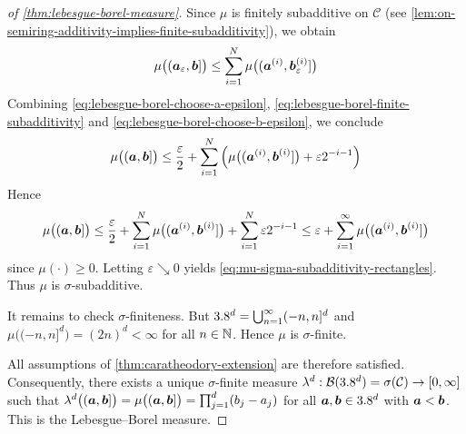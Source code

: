 \begin{proof}[of \autoref{thm:lebesgue-borel-measure}]
Since \(\mu\) is finitely subadditive on \(\mathcal{C}\) (see \autoref{lem:on-semiring-additivity-implies-finite-subadditivity}), we obtain
\begin{equation}\label{eq:lebesgue-borel-finite-subadditivity}
\mu\bigl(({\boldsymbol{a}}_\varepsilon,{\boldsymbol{b}}]\bigr)
\le
\sum_{i=1}^{N} \mu\bigl(({\boldsymbol{a}}^{(i)},{\boldsymbol{b}}^{(i)}_\varepsilon]\bigr)
\end{equation}
Combining \eqref{eq:lebesgue-borel-choose-a-epsilon}, \eqref{eq:lebesgue-borel-finite-subadditivity} and \eqref{eq:lebesgue-borel-choose-b-epsilon}, we conclude
\[
\mu\bigl(({\boldsymbol{a}},{\boldsymbol{b}}]\bigr)
\le
\frac{\varepsilon}{2}
+
\sum_{i=1}^{N}
\left(
\mu\bigl(({\boldsymbol{a}}^{(i)},{\boldsymbol{b}}^{(i)}]\bigr)
+
\varepsilon 2^{-i-1}
\right)
\]
Hence
\[
\mu\bigl(({\boldsymbol{a}},{\boldsymbol{b}}]\bigr)
\le
\frac{\varepsilon}{2}
+
\sum_{i=1}^{N}\mu\bigl(({\boldsymbol{a}}^{(i)},{\boldsymbol{b}}^{(i)}]\bigr)
+
\sum_{i=1}^{N}\varepsilon 2^{-i-1}
\le
\varepsilon
+
\sum_{i=1}^{\infty}\mu\bigl(({\boldsymbol{a}}^{(i)},{\boldsymbol{b}}^{(i)}]\bigr)
\]
since 
\(\mu(\cdot) \geq 0\).
Letting \(\varepsilon \searrow  0\) yields \eqref{eq:mu-sigma-subadditivity-rectangles}. Thus \(\mu\) is \(\sigma\)-subadditive.

It remains to check \(\sigma\)-finiteness. 
But
\(
3.8^d
=
\bigcup_{n=1}^{\infty} (-n,n]^d
\)
and
\(
\mu\bigl((-n,n]^d\bigr) = (2n)^d < \infty
\)
for all $n\in\mathbb{N}$.
Hence \(\mu\) is \(\sigma\)-finite.

All assumptions of \autoref{thm:caratheodory-extension} are therefore satisfied. 
Consequently, there exists a unique \(\sigma\)-finite measure
\(
\lambda^d : \mathcal{B}(3.8^d)=\sigma(\mathcal{C}) \to [0,\infty]
\)
such that
\(
\lambda^d\bigl(({\boldsymbol{a}},{\boldsymbol{b}}]\bigr)
=
\mu\bigl(({\boldsymbol{a}},{\boldsymbol{b}}]\bigr)
=
\prod_{j=1}^d (b_j-a_j)
\)
for all \({\boldsymbol{a}},{\boldsymbol{b}}\in3.8^d\) with \({\boldsymbol{a}}<{\boldsymbol{b}}\).
This is the Lebesgue--Borel measure.
\end{proof}

\pagebreak[3]

